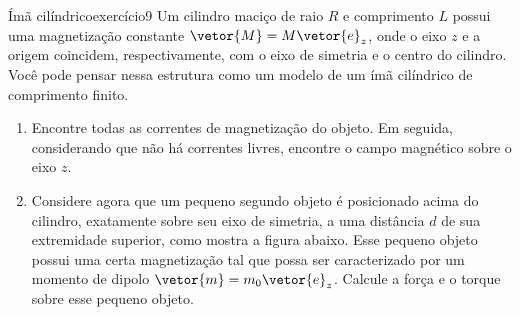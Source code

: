 \begin{exercício}{Ímã cilíndrico}{exercício9}
    Um cilindro maciço de raio \(R\) e comprimento \(L\) possui uma magnetização constante \(\vetor{M} = M \vetor{e}_z\), onde o eixo \(z\) e a origem coincidem, respectivamente, com o eixo de simetria e o centro do cilindro. Você pode pensar nessa estrutura como um modelo de um ímã cilíndrico de comprimento finito.
    \begin{enumerate}[label=(\alph*)]
        \item Encontre todas as correntes de magnetização do objeto. Em seguida, considerando que não há correntes livres, encontre o campo magnético sobre o eixo \(z\).
        \item Considere agora que um pequeno segundo objeto é posicionado acima do cilindro, exatamente sobre seu eixo de simetria, a uma distância \(d\) de sua extremidade superior, como mostra a figura abaixo. Esse pequeno objeto possui uma certa magnetização tal que possa ser caracterizado por um momento de dipolo \(\vetor{m} = m_0 \vetor{e}_z\). Calcule a força e o torque sobre esse pequeno objeto.

    \begin{center}
\end{center}
\end{enumerate}
\end{exercício}
